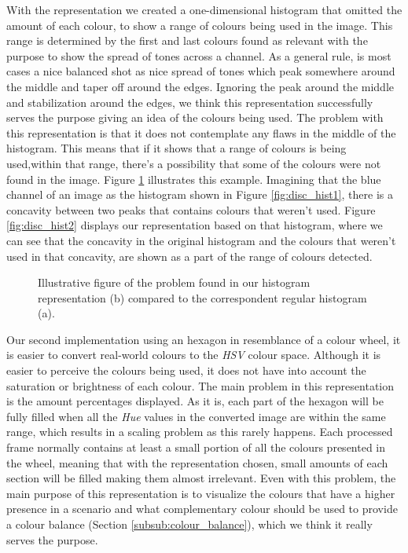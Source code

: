 With the representation we created a one-dimensional histogram that omitted the amount of each colour, to show a range of colours being used in the image. This range is determined by the first and last colours found as relevant with the purpose to show the spread of tones across a channel. As a general rule, is most cases a nice balanced shot as nice spread of tones which peak somewhere around the middle and taper off around the edges. Ignoring the peak around the middle and stabilization around the edges, we think this representation successfully serves the purpose giving an idea of the colours being used. The problem with this representation is that it does not contemplate any flaws in the middle of the histogram. This means that if it shows that a range of colours is being used,within that range, there's a possibility that some of the colours were not found in the image. Figure \ref{fig:disc_hist} illustrates this example. Imagining that the blue channel of an image as the histogram shown in Figure \ref{fig:disc_hist1}, there is a concavity between two peaks that contains colours that weren't used. Figure \ref{fig:disc_hist2} displays our representation based on that histogram, where we can see that the concavity in the original histogram and the colours that weren't used in that concavity, are shown as a part of the range of colours detected.

\begin{figure}[htb]
	\centering
  	\caption{Illustrative figure of the problem found in our histogram representation (b) compared to the correspondent regular histogram (a).}
	\label{fig:disc_hist}
\end{figure}

Our second implementation using an hexagon in resemblance of a colour wheel, it is easier to convert real-world colours to the \emph{HSV} colour space. Although it is easier to perceive the colours being used, it does not have into account the saturation or brightness of each colour. 
The main problem in this representation is the amount percentages displayed. As it is, each part of the hexagon will be fully filled when all the \emph{Hue} values in the converted image are within the same range, which results in a scaling problem as this rarely happens. Each processed frame normally contains at least a small portion of all the colours presented in the wheel, meaning that with the representation chosen, small amounts of each section will be filled making them almost irrelevant. Even with this problem, the main purpose of this representation is to visualize the colours that have a higher presence in a scenario and what complementary colour should be used to provide a colour balance (Section \ref{subsub:colour_balance}), which we think it really serves the purpose.


